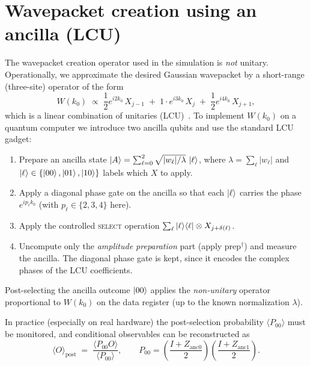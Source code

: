 \documentclass[11pt]{article}
\begin{document}
\section{Wavepacket creation using an ancilla (LCU)}
The wavepacket creation operator used in the simulation is \emph{not} unitary.
Operationally, we approximate the desired Gaussian wavepacket by a short-range
(three-site) operator of the form
\begin{equation}
W(k_0)\;\propto\;
\frac{1}{2}e^{i 2k_0}\,X_{j-1} \;+\;
1\cdot e^{i 3k_0}\,X_{j} \;+\;
\frac{1}{2}e^{i 4k_0}\,X_{j+1},
\end{equation}
which is a linear combination of unitaries (LCU)~\cite{2012_LCU,Berry_2015}. To implement $W(k_0)$ on a quantum
computer we introduce two ancilla qubits and use the standard LCU gadget:
\begin{enumerate}
  \item Prepare an ancilla state $\ket{A}=\sum_{\ell=0}^2 \sqrt{|w_\ell|/\lambda}\,\ket{\ell}$,
        where $\lambda=\sum_\ell |w_\ell|$ and $\ket{\ell}\in\{\ket{00},\ket{01},\ket{10}\}$ labels
        which $X$ to apply.
  \item Apply a diagonal phase gate on the ancilla so that each $\ket{\ell}$ carries the phase
        $e^{i p_\ell k_0}$ (with $p_\ell\in\{2,3,4\}$ here).
  \item Apply the controlled \textsc{select} operation
        $\sum_{\ell}\ket{\ell}\!\bra{\ell}\otimes X_{j+\delta(\ell)}$.
  \item Uncompute only the \emph{amplitude preparation} part (apply prep$^\dagger$) and measure the ancilla.
        The diagonal phase gate is kept, since it encodes the complex phases of the LCU coefficients.
\end{enumerate}
Post-selecting the ancilla outcome $\ket{00}$ applies the \emph{non-unitary} operator
proportional to $W(k_0)$ on the data register (up to the known normalization $\lambda$).

In practice (especially on real hardware) the post-selection probability $\langle P_{00}\rangle$
must be monitored, and conditional observables can be reconstructed as
\begin{equation}
\langle O\rangle_{\mathrm{post}} \;=\; \frac{\langle P_{00} O\rangle}{\langle P_{00}\rangle},
\qquad
P_{00}=\left(\frac{I+Z_{\mathrm{anc0}}}{2}\right)\left(\frac{I+Z_{\mathrm{anc1}}}{2}\right).
\end{equation}
\end{document}
